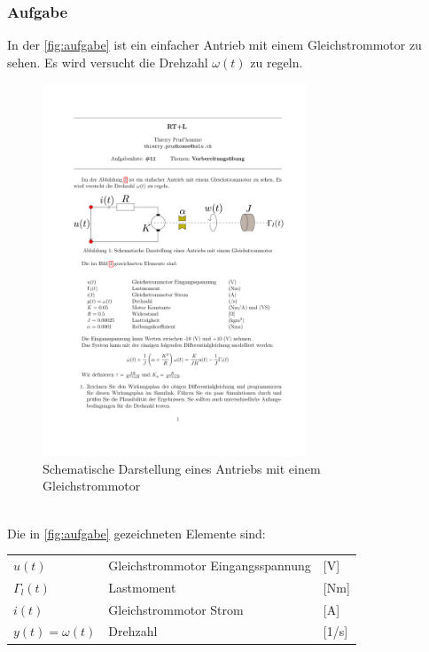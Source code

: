 \subsubsection*{Aufgabe}
\begin{aufgabe}
    In der \autoref{fig:aufgabe} ist ein einfacher Antrieb mit einem 
    Gleichstrommotor zu sehen. Es wird versucht die Drehzahl $\omega(t)$ zu 
    regeln.
    \begin{figure}[h!]
        \centering
        \includegraphics[page=1, width=0.7\textwidth, trim=70 470 50 250, clip=true]
            {aufgabe/RTL_VorbereitungUebung.pdf}
        \caption{Schematische Darstellung eines Antriebs mit einem Gleichstrommotor}
        \label{fig:aufgabe}
    \end{figure}
    \\
    Die in \autoref{fig:aufgabe} gezeichneten Elemente sind: \\
    \begin{tabular}{@{}lll}
        $u(t)$              & Gleichstrommotor Eingangsspannung & [V] \\
        $\Gamma_l(t)$       & Lastmoment                        & [Nm] \\
        $i(t)$              & Gleichstrommotor Strom            & [A] \\
        $y(t) = \omega(t)$  & Drehzahl                          & [1/s] \\

\end{tabular}
\end{aufgabe}
